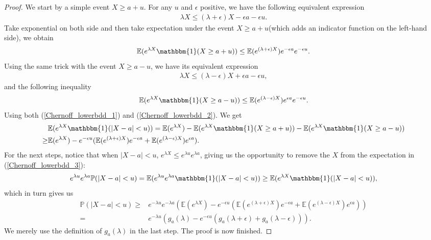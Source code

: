 \documentclass[10pt]{article}
\newcommand{\e}{\mathbb{E}}
\newcommand{\p}{\mathbb{P}}
\newenvironment{Proof of lemma}{\noindent{\bf Proof of Lemma}}{\hfill$\Box$\newline}
\newenvironment{Proof of claim}{\noindent{\bf Proof of claim}}{\hfill$\Box$\newline}
\newenvironment{Proof of theorem}{\noindent{\bf Proof of Theorem}}{\hfill\scriptsize{$\Box$}\newline}
\newenvironment{Proof of theorems}{\noindent{\bf Proof of Theorems}}{\hfill$\Box$\newline}
\newenvironment{Proof of proposition}{\noindent{\bf Proof of Proposition}}{\hfill$\Box$\newline}
\newenvironment{Proof of propositions}{\noindent{\bf Proof of Propositions}}{\hfill$\Box$\newline}
\newenvironment{Proof of exercise}{\noindent{\it Proof of Exercise:}}{\hfill$\Box$}
\numberwithin{equation}{section}
\begin{document}
\begin{proof}
    We start by a simple event $X \geq a+u$. For any $u$ and $\epsilon$ positive, we have the following equivalent expression
    \begin{align}
        \lambda X \leq (\lambda+\epsilon)X - \epsilon a - \epsilon u.
    \end{align}
    Take exponential on both side and then take expectation under the event $X \geq a+u$(which adds an indicator function on the left-hand side), we obtain
    \begin{align} \label{Chernoff_lowerbdd_1}
        \e(e^{\lambda X} \mathbbm{1}(X \geq a+u)) \leq \e(e^{(\lambda+\epsilon)X})e^{- \epsilon a}e^{- \epsilon u}.
    \end{align}
    Using the same trick with the event $X \geq a-u$, we have its equivalent expression
    \begin{align}
        \lambda X \leq (\lambda-\epsilon)X + \epsilon a - \epsilon u,
    \end{align}
    and the following inequality
    \begin{align} \label{Chernoff_lowerbdd_2}
        \e(e^{\lambda X} \mathbbm{1}(X \geq a-u)) \leq \e(e^{(\lambda-\epsilon)X})e^{ \epsilon a}e^{- \epsilon u}.
    \end{align}
    Using both (\ref{Chernoff_lowerbdd_1}) and (\ref{Chernoff_lowerbdd_2}). We get
    \begin{align} \label{Chernoff_lowerbdd_3}
        &\e(e^{\lambda X} \mathbbm{1}(|X-a|<u)) = \e(e^{\lambda X}) - \e(e^{\lambda X} \mathbbm{1}(X \geq a+u)) - \e(e^{\lambda X} \mathbbm{1}(X \geq a-u)) \nonumber \\
        \geq & \e(e^{\lambda X}) - e^{-\epsilon u}(\e(e^{(\lambda+\epsilon)X})e^{- \epsilon a}+\e(e^{(\lambda-\epsilon)X})e^{ \epsilon a}).
    \end{align}
    For the next steps, notice that when $|X-a|<u$, $e^{\lambda X} \leq e^{\lambda u} e^{\lambda a}$, giving us the opportunity to remove the $X$ from the expectation in (\ref{Chernoff_lowerbdd_3}):
    \begin{align}
        e^{\lambda u} e^{\lambda a} \p(|X-a|<u) = \e(e^{\lambda u} e^{\lambda a}\mathbbm{1}(|X-a|<u)) \geq \e(e^{\lambda X} \mathbbm{1}(|X-a|<u)),
    \end{align}
    which in turn gives us
    \begin{align}
        \p(|X-a|<u) \geq &e^{-\lambda u} e^{-\lambda a} (\e(e^{\lambda X}) - e^{-\epsilon u}(\e(e^{(\lambda+\epsilon)X})e^{- \epsilon a}+\e(e^{(\lambda-\epsilon)X})e^{ \epsilon a})) \nonumber \\
        =&e^{-\lambda u}(g_a(\lambda)-e^{-\epsilon u}(g_a(\lambda+\epsilon)+g_a(\lambda-\epsilon))).
    \end{align}
    We merely use the definition of $g_a(\lambda)$ in the last step. The proof is now finished.

\end{proof}
\end{document}
